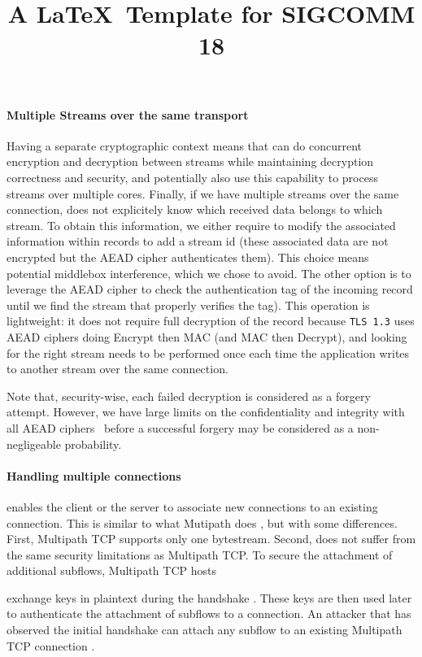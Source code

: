 \paragraph*{Multiple Streams over the same transport}
Having a separate cryptographic context means that \tcpls can do concurrent
encryption and decryption between streams while maintaining decryption
correctness and security, and potentially also use this capability to process
streams over multiple cores. Finally, if we have multiple streams over the same
\tcp connection, \tcpls does not explicitely know which received data belongs to
which stream. To obtain this information, we either require to modify the
associated information within  \tls records to add a stream id (these associated
data are not encrypted but the AEAD cipher authenticates them). This choice
means potential middlebox interference, which we chose to avoid. The other
option is to leverage the AEAD cipher to check the authentication tag of the
incoming record until we find the stream that properly verifies the tag). This
operation is lightweight: it does not require full decryption of the record
because \texttt{TLS 1.3} uses AEAD ciphers doing Encrypt then MAC (and MAC then
Decrypt), and looking for the right stream needs to be performed once each time
the application writes to another stream over the same \tcp connection.

Note that, security-wise, each failed decryption is considered as a
forgery attempt. However, we have large limits on the confidentiality and
integrity with all AEAD ciphers~\cite{luykx2015limits, aeadlimits} before a
successful forgery may be considered as a non-negligeable probability.

\paragraph*{Handling multiple \tcp connections}
\tcpls enables the client
or the server to associate new \tcp connections to an existing \tcpls
connection. This is similar to what Mutipath \tcp does \cite{raiciu2012hard,rfc6824},
but with some differences. First, Multipath TCP supports only one bytestream.
Second, \tcpls does not suffer from the same security limitations as Multipath
TCP. To secure the attachment of additional subflows, Multipath TCP hosts
\title{A \LaTeX\ Template for SIGCOMM 18}
exchange keys in plaintext during the handshake \cite{rfc6824, rfc8684}.
These keys are
then used later to authenticate the attachment of subflows to a connection. An
attacker that has observed the initial handshake can attach any subflow to an
existing Multipath TCP connection \cite{rfc6181}.

